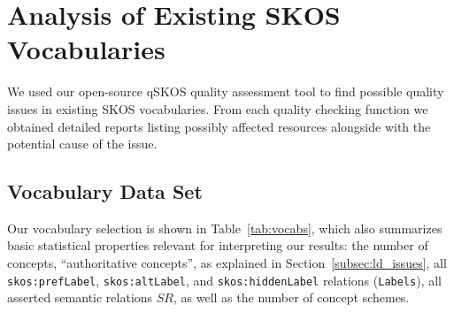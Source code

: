
\section{Analysis of Existing SKOS Vocabularies}\label{sec:analysis}

We used our open-source qSKOS quality assessment tool to find possible quality issues in existing SKOS vocabularies. From each quality checking function we obtained detailed reports listing possibly affected resources alongside with the potential cause of the issue.

\subsection{Vocabulary Data Set}

Our vocabulary selection is shown in Table~\ref{tab:vocabs}, which also summarizes basic statistical properties relevant for interpreting our results: the number of concepts, ``authoritative concepts'', as explained in Section~\ref{subsec:ld_issues}, all \texttt{skos:prefLabel}, \texttt{skos:altLabel}, and \texttt{skos:hiddenLabel} relations (\texttt{Labels}), all asserted semantic relations $SR$, as well as the number of concept schemes.


